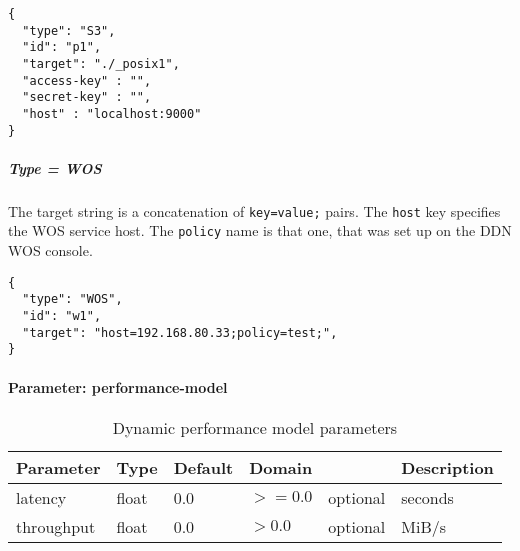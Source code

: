 \begin{lstlisting}
{
  "type": "S3",
  "id": "p1",
  "target": "./_posix1",
  "access-key" : "",
  "secret-key" : "",
  "host" : "localhost:9000"
}
\end{lstlisting}
\FloatBarrier
\vspace{\gapsize}


\subparagraph{Type = WOS}
The target string is a concatenation of \lstinline|key=value;| pairs.
The \lstinline|host| key specifies the WOS service host.
The \lstinline|policy| name is that one, that was set up on the DDN WOS console.

\begin{lstlisting}
{
  "type": "WOS",
  "id": "w1",
  "target": "host=192.168.80.33;policy=test;",
}
\end{lstlisting}
\FloatBarrier
\vspace{\gapsize}


\paragraph{Parameter: performance-model}

\begin{preserve}
\begin{table}[!ht]
  \begin{center}
    \begin{tabularx}{\textwidth}{lllllX}
      Parameter  & Type  & Default & Domain &          & Description \\ 
      \hline
      latency    & float & 0.0     & $>=0.0$  & optional & seconds     \\ 
      throughput & float & 0.0     & $>0.0$   & optional & MiB/s       \\ 
    \end{tabularx}
  \end{center}
  \caption{Dynamic performance model parameters}%
  \label{tab:dyn_perf_model_conf_params}
\end{table}
\end{preserve}


